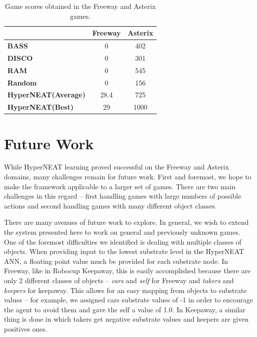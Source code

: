 \documentclass{acm_proc_article-sp}
\begin{document}
\begin{table}
\begin{center}
\begin{tabular}{|l|c|c|}
\hline
~ & \textbf{Freeway} & \textbf{Asterix} \\ \hline
\textbf{BASS} & 0 & 402 \\ \hline
\textbf{DISCO} & 0 & 301 \\ \hline
\textbf{RAM} & 0 & 545 \\ \hline
\textbf{Random} & 0 & 156 \\ \hline
\textbf{HyperNEAT(Average)} & 28.4 & 725 \\ \hline
\textbf{HyperNEAT(Best)} & 29 & 1000 \\ 
\hline
\end{tabular}
\end{center}
\label{tab:results-table}
\caption{Game scores obtained in the Freeway and Asterix games.}
\end{table}

\section{Future Work}
\label{sec:futurework}
While HyperNEAT learning proved successful on the Freeway and Asterix domains, many challenges remain for future work. First and foremost, we hope to make the framework applicable to a larger set of games. There are two main challenges in this regard -- first handling games with large numbers of possible actions and second handling games with many different object classes.

There are many avenues of future work to explore. In general, we wish to extend the system presented here to work on general and previously unknown games. One of the foremost difficulties we identified is dealing with multiple classes of objects. When providing input to the lowest substrate level in the HyperNEAT ANN, a floating point value much be provided for each substrate node. In Freeway, like in Robocup Keepaway, this is easily accomplished because there are only 2 different classes of objects -- \textit{cars} and \textit{self} for Freeway and \textit{takers} and \textit{keepers} for keepaway. This allows for an easy mapping from objects to substrate values -- for example, we assigned cars substrate values of -1 in order to encourage the agent to avoid them and gave the self a value of 1.0. In Keepaway, a similar thing is done in which takers get negative substrate values and keepers are given positives ones. 
\end{document}
